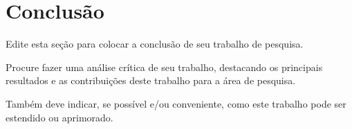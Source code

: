 

\section{Conclusão}\label{sec:conclusao}

Edite esta seção para colocar a conclusão de seu trabalho de pesquisa.

Procure fazer uma análise crítica de seu trabalho, destacando os principais resultados e as contribuições deste trabalho para a área de pesquisa.

Também deve indicar, se possível e/ou conveniente, como este trabalho pode ser estendido ou aprimorado.


